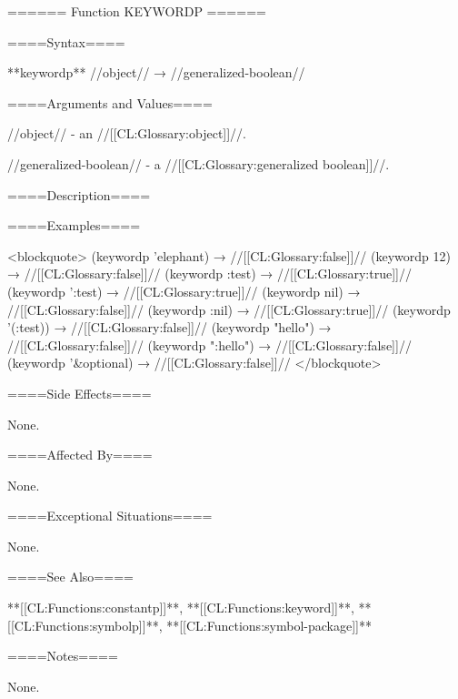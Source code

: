 ====== Function KEYWORDP ======

====Syntax====

**keywordp** //object// → //generalized-boolean//

====Arguments and Values====

//object// - an //[[CL:Glossary:object]]//.

//generalized-boolean// - a //[[CL:Glossary:generalized boolean]]//.

====Description====


====Examples====

<blockquote> (keywordp 'elephant) → //[[CL:Glossary:false]]// (keywordp 12) → //[[CL:Glossary:false]]// (keywordp :test) → //[[CL:Glossary:true]]// (keywordp ':test) → //[[CL:Glossary:true]]// (keywordp nil) → //[[CL:Glossary:false]]// (keywordp :nil) → //[[CL:Glossary:true]]// (keywordp '(:test)) → //[[CL:Glossary:false]]// (keywordp "hello") → //[[CL:Glossary:false]]// (keywordp ":hello") → //[[CL:Glossary:false]]// (keywordp '&optional) → //[[CL:Glossary:false]]// </blockquote>

====Side Effects====

None.

====Affected By====

None.

====Exceptional Situations====

None.

====See Also====

**[[CL:Functions:constantp]]**, **[[CL:Functions:keyword]]**, **[[CL:Functions:symbolp]]**, **[[CL:Functions:symbol-package]]**

====Notes====

None.

